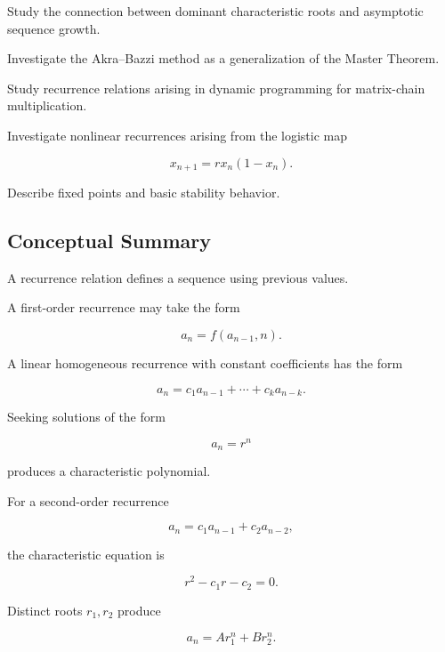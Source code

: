 \begin{exercise}[4]
Study the connection between dominant characteristic roots and
asymptotic sequence growth.
\end{exercise}

\begin{exercise}[4]
Investigate the Akra--Bazzi method as a generalization of the Master
Theorem.
\end{exercise}

\begin{exercise}[4]
Study recurrence relations arising in dynamic programming for
matrix-chain multiplication.
\end{exercise}

\begin{exercise}[4]
Investigate nonlinear recurrences arising from the logistic map

\[
x_{n+1}=rx_n(1-x_n).
\]

Describe fixed points and basic stability behavior.
\end{exercise}

\subsection{Conceptual Summary}
\label{subsec:recurrence-summary}

A recurrence relation defines a sequence using previous values.

A first-order recurrence may take the form

\[
\boxed{
a_n=f(a_{n-1},n).
}
\]

A linear homogeneous recurrence with constant coefficients has the form

\[
\boxed{
a_n
=
c_1a_{n-1}
+\cdots+
c_ka_{n-k}.
}
\]

Seeking solutions of the form

\[
a_n=r^n
\]

produces a characteristic polynomial.

For a second-order recurrence

\[
a_n=c_1a_{n-1}+c_2a_{n-2},
\]

the characteristic equation is

\[
\boxed{
r^2-c_1r-c_2=0.
}
\]

Distinct roots \(r_1,r_2\) produce

\[
\boxed{
a_n
=
Ar_1^n+Br_2^n.
}
\]

